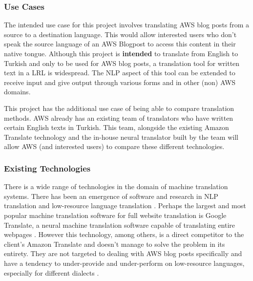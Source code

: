 
\subsubsection{Use Cases}
\indent \indent The intended use case for this project involves translating AWS blog posts from a source to a destination language. This would allow interested users who don't speak the source language of an AWS Blogpost to access this content in their native tongue. Although this project is \textbf{intended} to translate from English to Turkish and only to be used for AWS blog posts, a translation tool for written text in a \acrlong{LRL} is widespread. The \acrshort{NLP} aspect of this tool can be extended to receive input and give output through various forms and in other (non) AWS domains.

\indent This project has the additional use case of being able to compare translation methods. AWS already has an existing team of translators who have written certain English texts in Turkish. This team, alongside the existing Amazon Translate technology and the in-house neural translator built by the team will allow AWS (and interested users) to compare these different technologies.


\subsubsection{Existing Technologies}
\indent \indent There is a wide range of technologies in the domain of machine translation systems.  There has been an emergence of software and research in NLP translation \cite{NLP_Today} and low-resource language translation \cite{NLP_for_LRR}. Perhaps the largest and most popular machine translation software for full website translation is Google Translate, a neural machine translation software capable of translating entire webpages \cite{WebsiteTranslation}. However this technology, among others, is a direct competitor to the client's Amazon Translate and doesn't manage to solve the problem in its entirety. They are not targeted to dealing with AWS blog posts specifically and have a tendency to under-provide and under-perform on low-resource languages, especially for different dialects \cite{Building_LRR_Translation}.

